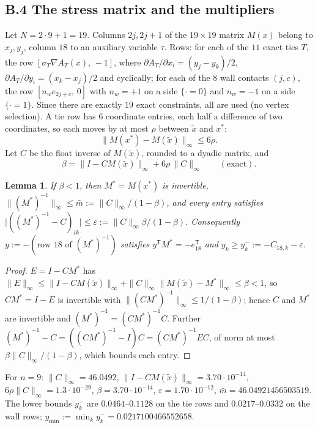 \documentclass[11pt]{amsart}
\newtheorem{lemma}[theorem]{Lemma}
\theoremstyle{definition}
\begin{document}
\subsection*{B.4 The stress matrix and the multipliers}
Let $N = 2\cdot9 + 1 = 19$. Columns $2j, 2j+1$ of the $19\times19$ matrix $M(x)$ belong to $x_j, y_j$, column $18$ to an auxiliary variable $\tau$. Rows: for each of the $11$ exact ties $T$, the row $[\sigma_T\nabla A_T(x),\, -1]$, where $\partial A_T/\partial x_i = (y_j - y_k)/2$, $\partial A_T/\partial y_i = (x_k - x_j)/2$ and cyclically; for each of the $8$ wall contacts $(j,c)$, the row $[n_w e_{2j+c},\, 0]$ with $n_w = +1$ on a side $\{\cdot = 0\}$ and $n_w = -1$ on a side $\{\cdot = 1\}$. Since there are exactly $19$ exact constraints, all are used (no vertex selection). A tie row has $6$ coordinate entries, each half a difference of two coordinates, so each moves by at most $\rho$ between $\tilde x$ and $x^*$:
\[
 \|M(x^*) - M(\tilde x)\|_\infty \le 6\rho .
\]
Let $C$ be the float inverse of $M(\tilde x)$, rounded to a dyadic matrix, and
\[
 \beta = \|I - C M(\tilde x)\|_\infty + 6\rho\,\|C\|_\infty \qquad(\text{exact}).
\]
\begin{lemma}\label{lem:stress}
If $\beta < 1$, then $M^* = M(x^*)$ is invertible, $\|(M^*)^{-1}\|_\infty \le \bar m := \|C\|_\infty/(1-\beta)$, and every entry satisfies $\lvert ((M^*)^{-1} - C)_{ik}\rvert \le \varepsilon := \|C\|_\infty\beta/(1-\beta)$. Consequently $y := -(\text{row } 18 \text{ of } (M^*)^{-1})$ satisfies $y^{\mathsf T}M^* = -e_{18}^{\mathsf T}$ and $y_k \ge y_k^- := -C_{18,k} - \varepsilon$.
\end{lemma}
\begin{proof}
$E = I - CM^*$ has $\|E\|_\infty \le \|I - CM(\tilde x)\|_\infty + \|C\|_\infty\|M(\tilde x) - M^*\|_\infty \le \beta < 1$, so $CM^* = I - E$ is invertible with $\|(CM^*)^{-1}\|_\infty \le 1/(1-\beta)$; hence $C$ and $M^*$ are invertible and $(M^*)^{-1} = (CM^*)^{-1}C$. Further $(M^*)^{-1} - C = ((CM^*)^{-1} - I)C = (CM^*)^{-1}EC$, of norm at most $\beta\|C\|_\infty/(1-\beta)$, which bounds each entry.
\end{proof}
For $n = 9$: $\|C\|_\infty = 46.0492$, $\|I - CM(\tilde x)\|_\infty = 3.70\cdot10^{-14}$, $6\rho\|C\|_\infty = 1.3\cdot10^{-29}$, $\beta = 3.70\cdot10^{-14}$, $\varepsilon = 1.70\cdot10^{-12}$, $\bar m = 46.04921456503519$. The lower bounds $y_k^-$ are $0.0464$--$0.1128$ on the tie rows and $0.0217$--$0.0332$ on the wall rows; $y_{\min} := \min_k y_k^- = 0.0217100466552658$.
\end{document}
